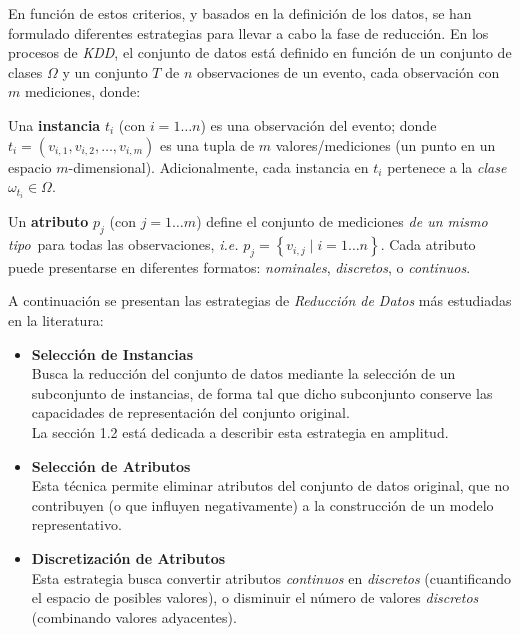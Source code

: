 En función de estos criterios, y basados en la definición de los datos, se han formulado diferentes estrategias para llevar a cabo la fase de reducción. En los procesos de \emph{KDD}, el conjunto de datos está definido en función de un conjunto de clases $\Omega$ y un conjunto $T$ de $n$ observaciones de un evento, cada observación con $m$ mediciones, donde:\\

\begin{definicion}
Una \textbf{instancia} $t_i$ (con $i = 1\dots n$) es una observación del evento; donde $t_i = (v_{i,1}, v_{i,2}, \dots, v_{i,m})$ es una tupla de $m$ valores/mediciones (un punto en un espacio $m$-dimensional). Adicionalmente, cada instancia en $t_i$ pertenece a la \emph{clase} $\omega_{t_i} \in \Omega$.\\
\end{definicion}

\begin{definicion}
Un \textbf{atributo} $p_j$ (con $j = 1\dots m$) define el conjunto de mediciones \guillemotleft\emph{de un mismo tipo}\guillemotright\ para todas las observaciones, \emph{i.e.} $p_j = \left\{ v_{i,j} \mid i = 1\dots n \right\}$. Cada atributo puede presentarse en diferentes formatos: \emph{nominales}, \emph{discretos}, o \emph{continuos}.
\end{definicion}

A continuación se presentan las estrategias de \emph{Reducción de Datos} más estudiadas en la literatura:

\begin{itemize}
\item \textbf{Selección de Instancias}
\cite{DBLP:journals/ai/BlumL97,Liu:2002:IIS:593433.593525}\\
Busca la reducción del conjunto de datos mediante la selección de un subconjunto de instancias, de forma tal que dicho subconjunto conserve las capacidades de representación del conjunto original.\\
La sección 1.2 está dedicada a describir esta estrategia en amplitud.
\item \textbf{Selección de Atributos}
\cite{DBLP:journals/ai/BlumL97, Liu:1998:FEC:551943}\\
Esta técnica permite eliminar atributos del conjunto de datos original, que no contribuyen (o que influyen negativamente) a la construcción de un modelo representativo.
\item \textbf{Discretización de Atributos}
\cite{DBLP:conf/ijcai/FayyadI93, Liu:2002:DET:593435.593535}\\
Esta estrategia busca convertir atributos \emph{continuos} en \emph{discretos} (cuantificando el espacio de posibles valores), o disminuir el número de valores \emph{discretos} (combinando valores adyacentes).
\end{itemize}


